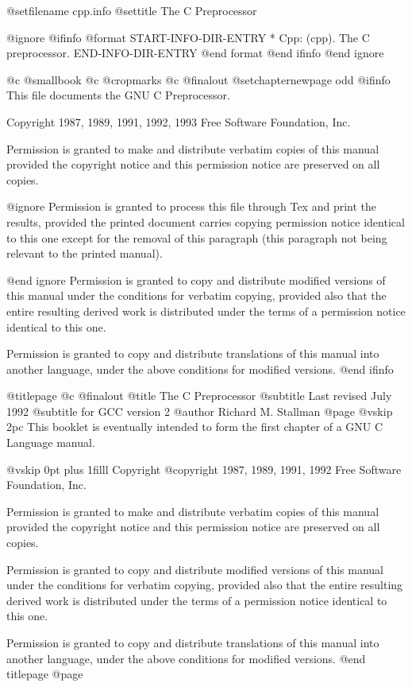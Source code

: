 
@setfilename cpp.info
@settitle The C Preprocessor

@ignore
@ifinfo
@format
START-INFO-DIR-ENTRY
* Cpp: (cpp).			The C preprocessor.
END-INFO-DIR-ENTRY
@end format
@end ifinfo
@end ignore

@c @smallbook
@c @cropmarks
@c @finalout
@setchapternewpage odd
@ifinfo
This file documents the GNU C Preprocessor.

Copyright 1987, 1989, 1991, 1992, 1993 Free Software Foundation, Inc.

Permission is granted to make and distribute verbatim copies of
this manual provided the copyright notice and this permission notice
are preserved on all copies.

@ignore
Permission is granted to process this file through Tex and print the
results, provided the printed document carries copying permission
notice identical to this one except for the removal of this paragraph
(this paragraph not being relevant to the printed manual).

@end ignore
Permission is granted to copy and distribute modified versions of this
manual under the conditions for verbatim copying, provided also that
the entire resulting derived work is distributed under the terms of a
permission notice identical to this one.

Permission is granted to copy and distribute translations of this manual
into another language, under the above conditions for modified versions.
@end ifinfo

@titlepage
@c @finalout
@title The C Preprocessor
@subtitle Last revised July 1992
@subtitle for GCC version 2
@author Richard M. Stallman
@page
@vskip 2pc
This booklet is eventually intended to form the first chapter of a GNU 
C Language manual.

@vskip 0pt plus 1filll
Copyright @copyright{} 1987, 1989, 1991, 1992 Free Software Foundation, Inc.

Permission is granted to make and distribute verbatim copies of
this manual provided the copyright notice and this permission notice
are preserved on all copies.

Permission is granted to copy and distribute modified versions of this
manual under the conditions for verbatim copying, provided also that
the entire resulting derived work is distributed under the terms of a
permission notice identical to this one.

Permission is granted to copy and distribute translations of this manual
into another language, under the above conditions for modified versions.
@end titlepage
@page

